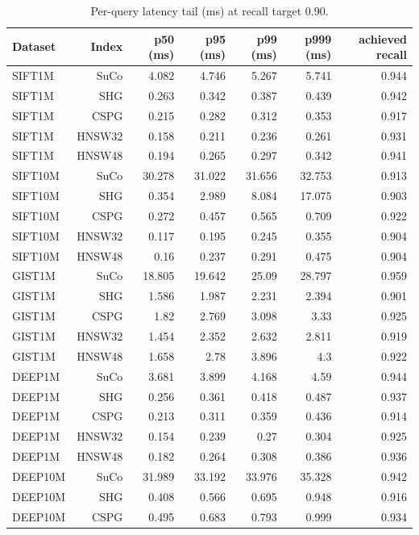 \begin{table}[t]
\centering
\small
\caption{Per-query latency tail (ms) at recall target 0.90.}
\label{tab:latency-tail-r90}
\begin{tabular}{lrrrrrr}
\toprule
Dataset & Index & p50 (ms) & p95 (ms) & p99 (ms) & p999 (ms) & achieved recall \\
\midrule
SIFT1M & SuCo & 4.082 & 4.746 & 5.267 & 5.741 & 0.944 \\
SIFT1M & SHG & 0.263 & 0.342 & 0.387 & 0.439 & 0.942 \\
SIFT1M & CSPG & 0.215 & 0.282 & 0.312 & 0.353 & 0.917 \\
SIFT1M & HNSW32 & 0.158 & 0.211 & 0.236 & 0.261 & 0.931 \\
SIFT1M & HNSW48 & 0.194 & 0.265 & 0.297 & 0.342 & 0.941 \\
SIFT10M & SuCo & 30.278 & 31.022 & 31.656 & 32.753 & 0.913 \\
SIFT10M & SHG & 0.354 & 2.989 & 8.084 & 17.075 & 0.903 \\
SIFT10M & CSPG & 0.272 & 0.457 & 0.565 & 0.709 & 0.922 \\
SIFT10M & HNSW32 & 0.117 & 0.195 & 0.245 & 0.355 & 0.904 \\
SIFT10M & HNSW48 & 0.16 & 0.237 & 0.291 & 0.475 & 0.904 \\
GIST1M & SuCo & 18.805 & 19.642 & 25.09 & 28.797 & 0.959 \\
GIST1M & SHG & 1.586 & 1.987 & 2.231 & 2.394 & 0.901 \\
GIST1M & CSPG & 1.82 & 2.769 & 3.098 & 3.33 & 0.925 \\
GIST1M & HNSW32 & 1.454 & 2.352 & 2.632 & 2.811 & 0.919 \\
GIST1M & HNSW48 & 1.658 & 2.78 & 3.896 & 4.3 & 0.922 \\
DEEP1M & SuCo & 3.681 & 3.899 & 4.168 & 4.59 & 0.944 \\
DEEP1M & SHG & 0.256 & 0.361 & 0.418 & 0.487 & 0.937 \\
DEEP1M & CSPG & 0.213 & 0.311 & 0.359 & 0.436 & 0.914 \\
DEEP1M & HNSW32 & 0.154 & 0.239 & 0.27 & 0.304 & 0.925 \\
DEEP1M & HNSW48 & 0.182 & 0.264 & 0.308 & 0.386 & 0.936 \\
DEEP10M & SuCo & 31.989 & 33.192 & 33.976 & 35.328 & 0.942 \\
DEEP10M & SHG & 0.408 & 0.566 & 0.695 & 0.948 & 0.916 \\
DEEP10M & CSPG & 0.495 & 0.683 & 0.793 & 0.999 & 0.934 \\

\end{tabular}
\end{table}
